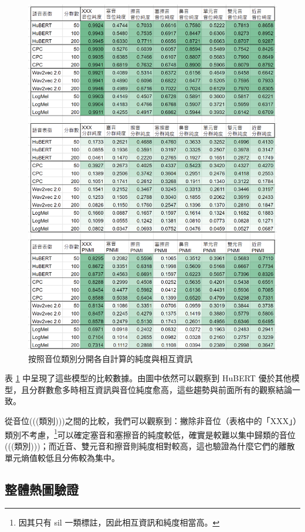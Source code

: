 \begin{figure}
    \centering
    \includegraphics[width=1\linewidth]{figures/pur-of-each-cls-xls.png}
     \caption{按照音位類別分開各自計算的純度與相互資訊}
     \label{fig:pur-of-each-cls}
\end{figure}


        表 \ref{fig:pur-of-each-cls} 中呈現了這些模型的比較數據。由圖中依然可以觀察到 HuBERT 優於其他模型，且分群數愈多時相互資訊與音位純度愈高，這些趨勢與前面所有的觀察結論一致。

        從音位(((類別)))之間的比較，我們可以觀察到：撇除非音位（表格中的「XXX」）類別不考慮，\footnote{因其只有 sil 一類標註，因此相互資訊和純度相當高。}可以確定塞音和塞擦音的純度較低，確實是較難以集中歸類的音位(((類別)))；而近音、雙元音和擦音則純度相對較高，這也驗證為什麼它們的離散單元熵值較低且分佈較為集中。

\subsection{整體熱圖驗證}

